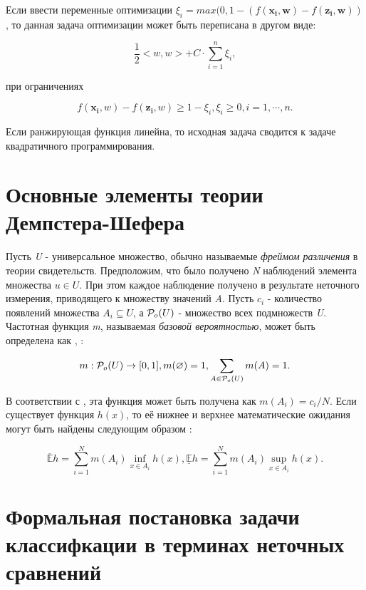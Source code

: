 \documentclass[12pt,a4paper,oneside]{article}
\begin{document}
Если ввести переменные оптимизации \(\xi_i = max(0, 1 - (f(\mathbf{x_i}, \mathbf{w}) - f(\mathbf{z_i}, \mathbf{w}))\), то данная задача оптимизации может быть переписана в другом виде:

\[
\frac{1}{2}<w, w> + C \cdot \sum \limits_{i=1}^n \xi_i,
\]

при ограничениях

\[
f(\mathbf{x_i}, w) - f(\mathbf{z_i}, w) \geq 1 - \xi_i, 
\xi_i \geq 0, i = 1, \cdots, n.
\]

Если ранжирующая функция линейна, то исходная задача сводится к задаче квадратичного программирования.


\section{Основные элементы теории Демпстера-Шефера}
\label{sec:dst_definitions}

\par
Пусть \emph{U} - универсальное множество, обычно называемые \emph{фреймом различения} в теории свидетельств. 
Предположим, что было получено \emph{N} наблюдений элемента множества \(u \in U\).
При этом каждое наблюдение получено в результате неточного измерения, приводящего к множеству значений \emph{A}.
Пусть \(c_i\) - количество появлений множества \(A_i \subseteq U\), а \(\mathcal{P}_o(U)\) - множество всех подмножеств \emph{U}.
Частотная функция \emph{m}, называемая \emph{базовой вероятностью}, может быть определена как , :

\[
m : \mathcal{P}_o(U) \to [0,1],
m(\varnothing) = 1, \sum \limits_{A \in \mathcal{P}_o(U)} m(A) = 1.
\]

\par
В соответствии с , эта функция может быть получена как \(m(A_i) = c_i / N\). 
Если существует функция \(h(x)\), то её нижнее и верхнее математические ожидания могут быть найдены следующим образом :

\[
\mathbb{\overline{E}} h = \sum \limits_{i=1}^N m(A_i) \inf_{x \in A_i} h(x), 
\mathbb{\underline{E}} h = \sum \limits_{i=1}^N m(A_i) \sup_{x \in A_i} h(x).
\]


\section{Формальная постановка задачи классифкации в терминах неточных сравнений}
\label{sec:classification_problem_by_imprecise_comparisons}
\end{document}
